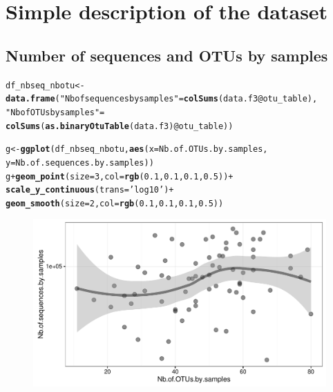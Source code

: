 \documentclass[12pt]{article}\usepackage[]{graphicx}\usepackage[]{color}
\makeatletter
\def\maxwidth{ %
  \ifdim\Gin@nat@width>\linewidth
    \linewidth
  \else
    \Gin@nat@width
  \fi
}
\newcommand{\hlnum}[1]{\textcolor[rgb]{0.686,0.059,0.569}{#1}}%
\newcommand{\hlstr}[1]{\textcolor[rgb]{0.192,0.494,0.8}{#1}}%
\newcommand{\hlopt}[1]{\textcolor[rgb]{0,0,0}{#1}}%
\newcommand{\hlstd}[1]{\textcolor[rgb]{0.345,0.345,0.345}{#1}}%
\newcommand{\hlkwb}[1]{\textcolor[rgb]{0.69,0.353,0.396}{#1}}%
\newcommand{\hlkwc}[1]{\textcolor[rgb]{0.333,0.667,0.333}{#1}}%
\newcommand{\hlkwd}[1]{\textcolor[rgb]{0.737,0.353,0.396}{\textbf{#1}}}%
\newenvironment{kframe}{%
 \def\at@end@of@kframe{}%
 \ifinner\ifhmode%
  \def\at@end@of@kframe{\end{minipage}}%
  \begin{minipage}{\columnwidth}%
 \fi\fi%
 \def\FrameCommand##1{\hskip\@totalleftmargin \hskip-\fboxsep
 \colorbox{shadecolor}{##1}\hskip-\fboxsep
     \hskip-\linewidth \hskip-\@totalleftmargin \hskip\columnwidth}%
 \MakeFramed {\advance\hsize-\width
   \@totalleftmargin\z@ \linewidth\hsize
   \@setminipage}}%
 {\par\unskip\endMakeFramed%
 \at@end@of@kframe}
\newenvironment{knitrout}{}{} %
\numberwithin{figure}{section}
\makeatother
\begin{document}
\section{Simple description of the dataset}

  \subsection{Number of sequences and OTUs by samples}

\begin{knitrout}\small
{}\color{fgcolor}\begin{kframe}
\begin{alltt}
\hlstd{df_nbseq_nbotu} \hlkwb{<-} \hlkwd{data.frame}\hlstd{(}\hlstr{"Nb of sequences by samples"} \hlstd{=} \hlkwd{colSums}\hlstd{(data.f3}\hlopt{@}\hlkwc{otu_table}\hlstd{),}
                             \hlstr{"Nb of OTUs by samples"} \hlstd{=}
                               \hlkwd{colSums}\hlstd{(}\hlkwd{as.binaryOtuTable}\hlstd{(data.f3)}\hlopt{@}\hlkwc{otu_table}\hlstd{))}

\hlstd{g} \hlkwb{<-} \hlkwd{ggplot}\hlstd{(df_nbseq_nbotu,} \hlkwd{aes}\hlstd{(}\hlkwc{x} \hlstd{= Nb.of.OTUs.by.samples,}
                                \hlkwc{y} \hlstd{= Nb.of.sequences.by.samples))}
\hlstd{g} \hlopt{+} \hlkwd{geom_point}\hlstd{(}\hlkwc{size} \hlstd{=} \hlnum{3}\hlstd{,} \hlkwc{col} \hlstd{=} \hlkwd{rgb}\hlstd{(}\hlnum{0.1}\hlstd{,} \hlnum{0.1}\hlstd{,} \hlnum{0.1}\hlstd{,} \hlnum{0.5}\hlstd{))} \hlopt{+}
  \hlkwd{scale_y_continuous}\hlstd{(}\hlkwc{trans} \hlstd{=} \hlstr{'log10'}\hlstd{)} \hlopt{+}
  \hlkwd{geom_smooth}\hlstd{(}\hlkwc{size} \hlstd{=} \hlnum{2}\hlstd{,} \hlkwc{col} \hlstd{=} \hlkwd{rgb}\hlstd{(}\hlnum{0.1}\hlstd{,} \hlnum{0.1}\hlstd{,} \hlnum{0.1}\hlstd{,} \hlnum{0.5}\hlstd{))}
\end{alltt}
\end{kframe}\begin{figure}

{\centering \includegraphics[width=\maxwidth]{figure/unnamed-chunk-19-1} 

}
\end{figure}
\end{knitrout}
\end{document}
